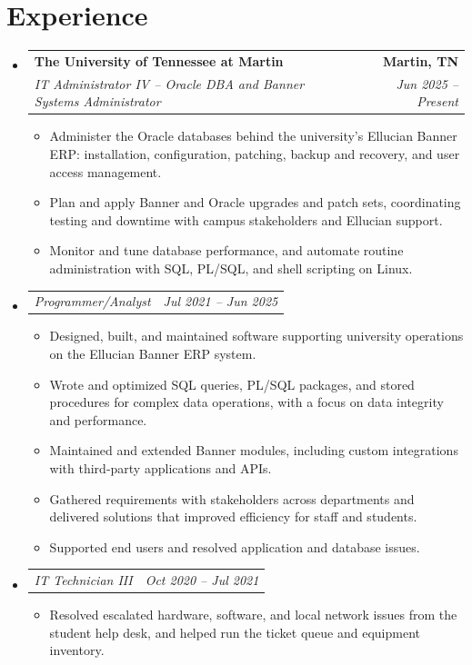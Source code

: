 \documentclass[letterpaper,11pt]{article}
\makeatletter
\newcommand{\resumeSubheading}[4]{
  \item
  \begin{tabular*}{\textwidth}[t]{l@{\extracolsep{\fill}}r}
    \textbf{#1} & \textbf{#2} \\
    \textit{\small #3} & \textit{\small #4} \\
  \end{tabular*}\vspace{-2pt}
}
\newcommand{\resumeSubRole}[2]{
  \item
  \begin{tabular*}{\textwidth}[t]{l@{\extracolsep{\fill}}r}
    \textit{\small #1} & \textit{\small #2} \\
  \end{tabular*}\vspace{-2pt}
}
\newenvironment{entries}{\begin{itemize}[leftmargin=0in, label={}, itemsep=1pt, topsep=0pt]}{\end{itemize}}
\newenvironment{bullets}{\begin{itemize}[leftmargin=0.2in, itemsep=0pt, topsep=1pt, parsep=0pt, label=\textbullet]\small}{\end{itemize}}
\makeatother
\begin{document}
\section{Experience}
\begin{entries}

  \resumeSubheading{The University of Tennessee at Martin}{Martin, TN}
    {IT Administrator IV -- Oracle DBA and Banner Systems Administrator}{Jun 2025 -- Present}
  \begin{bullets}
    \item Administer the Oracle databases behind the university's Ellucian Banner ERP: installation,
      configuration, patching, backup and recovery, and user access management.
    \item Plan and apply Banner and Oracle upgrades and patch sets, coordinating testing and downtime
      with campus stakeholders and Ellucian support.
    \item Monitor and tune database performance, and automate routine administration with SQL, PL/SQL,
      and shell scripting on Linux.
  \end{bullets}

  \resumeSubRole{Programmer/Analyst}{Jul 2021 -- Jun 2025}
  \begin{bullets}
    \item Designed, built, and maintained software supporting university operations on the Ellucian
      Banner ERP system.
    \item Wrote and optimized SQL queries, PL/SQL packages, and stored procedures for complex data
      operations, with a focus on data integrity and performance.
    \item Maintained and extended Banner modules, including custom integrations with third-party
      applications and APIs.
    \item Gathered requirements with stakeholders across departments and delivered solutions that
      improved efficiency for staff and students.
    \item Supported end users and resolved application and database issues.
  \end{bullets}

  \resumeSubRole{IT Technician III}{Oct 2020 -- Jul 2021}
  \begin{bullets}
    \item Resolved escalated hardware, software, and local network issues from the student help desk,
      and helped run the ticket queue and equipment inventory.
  \end{bullets}


\end{entries}
\end{document}
